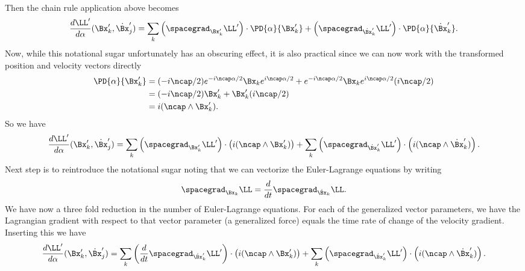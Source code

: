 {\begin{equation}
\begin{aligned}
\end{aligned}
\end{equation}
%
Then the chain rule application above becomes
%
\begin{equation}\label{eqn:goldsteinCh12:420}
\frac{d \LL'}{d\alpha} (\Bx_k', \dot{\Bx}_j')
= \sum_{k} \left( \spacegrad_{\Bx_k'} \LL'\right) \cdot \PD{\alpha}{\Bx_k'} + \left( \spacegrad_{\dot{\Bx}_k'} \LL' \right) \cdot \PD{\alpha}{\dot{\Bx}_k'} .
\end{equation}
%
Now, while this notational sugar unfortunately has an obscuring effect, it is also practical since we can now work with the transformed position
and velocity vectors directly
%
\begin{equation}\label{eqn:goldsteinCh12:440}
\begin{aligned}
\PD{\alpha}{\Bx_k'}
&= (-i \ncap/2) e^{-i\ncap \alpha/2} {\Bx}_k e^{i\ncap\alpha/2} +e^{-i\ncap \alpha/2} {\Bx}_k e^{i\ncap\alpha/2} (i \ncap/2)  \\
&= (-i \ncap/2) \Bx_k' + \Bx_k' (i \ncap/2) \\
&= i (\ncap \wedge \Bx_k').
\end{aligned}
\end{equation}
%
So we have
\begin{equation}\label{eqn:goldsteinCh12:460}
\frac{d \LL'}{d\alpha} (\Bx_k', \dot{\Bx}_j')
= \sum_{k} \left( \spacegrad_{\Bx_k'} \LL'\right) \cdot \left( i (\ncap \wedge \Bx_k') \right)
+ \sum_{k} \left( \spacegrad_{\dot{\Bx}_k'} \LL'\right) \cdot \left( i (\ncap \wedge \dot{\Bx}_k') \right) .
\end{equation}
%
Next step is to reintroduce the notational sugar noting that we can vectorize the Euler-Lagrange equations by writing
%
\begin{equation}\label{eqn:goldsteinCh12:480}
\spacegrad_{\Bx_k} \LL = \frac{d}{dt} \spacegrad_{\dot{\Bx}_k} \LL.
\end{equation}
%
We have now a three fold reduction in the number of Euler-Lagrange equations.  For each of the generalized vector parameters, we have the
Lagrangian gradient with respect to that vector parameter (a generalized force) equals the time rate of change of the velocity gradient.
%
Inserting this we have
\begin{equation}\label{eqn:goldsteinCh12:500}
\frac{d \LL'}{d\alpha} (\Bx_k', \dot{\Bx}_j')
= \sum_{k} \left( \frac{d}{dt} \spacegrad_{\dot{\Bx}_k'} \LL'\right) \cdot \left( i (\ncap \wedge \Bx_k') \right)
+ \sum_{k} \left( \spacegrad_{\dot{\Bx}_k'} \LL'\right) \cdot \left( i (\ncap \wedge \dot{\Bx}_k') \right) .

\end{equation}}
